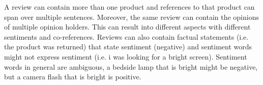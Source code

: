 A review can contain more than one product and references to that
product can span
over multiple sentences. Moreover, the same review can contain the
opinions of multiple
opinion holders. This can result into different aspects with
different sentiments and
co-references. Reviews can also contain factual statements (i.e. the
product was returned)
that state sentiment (negative) and sentiment words might not express
sentiment (i.e. i was looking for a bright screen).
Sentiment words in general are ambiguous, a bedside lamp that is
bright might be negative, but
a camera flash that is bright is positive.


